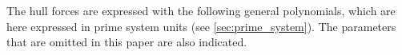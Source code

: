 The hull forces are expressed with the following general polynomials, which are here expressed in prime system units (see \autoref{sec:prime_system}). The parameters that are omitted in this paper are also indicated. 
\begin{equation}
    \label{eq:X_H}
    
\end{equation}
%
\begin{equation}
    \label{eq:Y_H}
    
\end{equation}
%
\begin{equation}
    \label{eq:N_H}
    
\end{equation}
